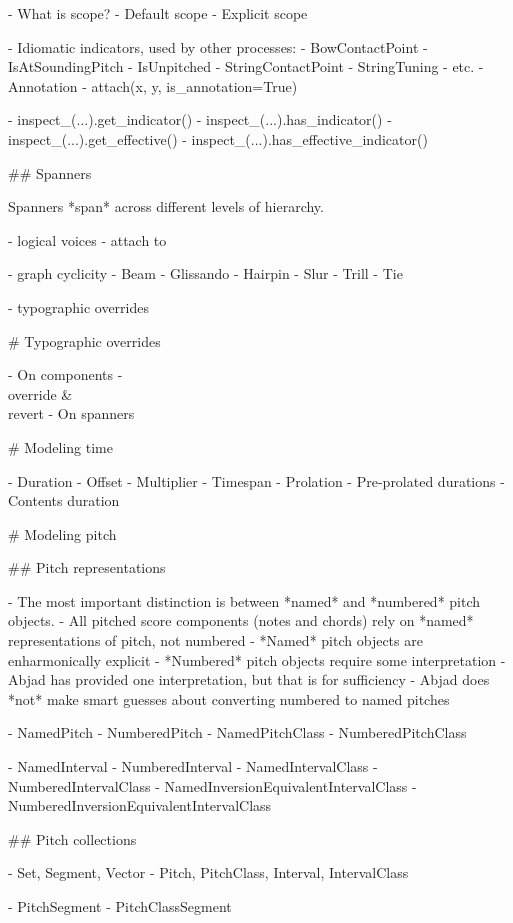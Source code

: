 \begin{markdown}
-   What is scope?
-   Default scope
-   Explicit scope

-   Idiomatic indicators, used by other processes:
    -   BowContactPoint
    -   IsAtSoundingPitch
    -   IsUnpitched
    -   StringContactPoint
    -   StringTuning
    -   etc.
-   Annotation
-   attach(x, y, is_annotation=True)

-   inspect_(...).get_indicator()
-   inspect_(...).has_indicator()
-   inspect_(...).get_effective()
-   inspect_(...).has_effective_indicator()

## Spanners

Spanners *span* across different levels of hierarchy.

-   logical voices
-   attach to

-   graph cyclicity
-   Beam
-   Glissando
-   Hairpin
-   Slur
-   Trill
-   Tie

-   typographic overrides

# Typographic overrides

-   On components
    - \\override & \\revert
-   On spanners

# Modeling time

-   Duration
-   Offset
-   Multiplier
-   Timespan
-   Prolation
-   Pre-prolated durations
-   Contents duration

# Modeling pitch

## Pitch representations

-   The most important distinction is between *named* and *numbered* pitch
    objects.
-   All pitched score components (notes and chords) rely on *named*
    representations of pitch, not numbered
-   *Named* pitch objects are enharmonically explicit
-   *Numbered* pitch objects require some interpretation
-   Abjad has provided one interpretation, but that is for sufficiency
-   Abjad does *not* make smart guesses about converting numbered to named
    pitches

-   NamedPitch
-   NumberedPitch
-   NamedPitchClass
-   NumberedPitchClass

-   NamedInterval
-   NumberedInterval
-   NamedIntervalClass
-   NumberedIntervalClass
-   NamedInversionEquivalentIntervalClass
-   NumberedInversionEquivalentIntervalClass

## Pitch collections

-   Set, Segment, Vector
-   Pitch, PitchClass, Interval, IntervalClass

-   PitchSegment
-   PitchClassSegment


\end{markdown}
